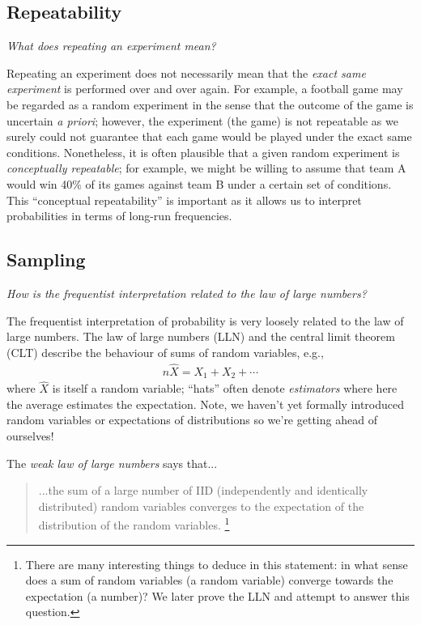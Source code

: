 \documentclass[11pt,a4paper]{article}
\begin{document}
\subsection{Repeatability}

\emph{What does repeating an experiment mean?}

Repeating an experiment does not necessarily mean 
that the \emph{exact same experiment} is performed over and over
again. 
For example, 
a football game may be regarded as a random experiment in 
the sense that the outcome of the game is uncertain \emph{a priori}; 
however, 
the experiment (the game) is not repeatable as
we surely could not guarantee that each game would be played
under the exact same conditions. 
Nonetheless, 
it is often plausible that a given random experiment 
is \emph{conceptually repeatable}; 
for example,
we might be willing to assume that team A would win 40\% of
its games against team B under a certain set of conditions. 
This ``conceptual repeatability'' is important as it allows us to interpret
probabilities in terms of long-run frequencies.

\subsection{Sampling}

\emph{How is the frequentist interpretation related to the law of large numbers?}

The frequentist interpretation of probability is very loosely related to the law of large numbers.
The law of large numbers (LLN)
and the central limit theorem (CLT) describe the behaviour of sums of random variables, e.g.,
\begin{align}
n\widehat{X} = X_{1} + X_{2} + \cdots
\end{align}
where \(\widehat{X}\) is itself a random variable; 
``hats'' often denote \emph{estimators} where here the average estimates the expectation. 
Note, we haven't yet formally introduced random variables or 
expectations of distributions so we're getting ahead of ourselves!

The \emph{weak law of large numbers} says that...

\begin{quote}
...the sum of a large number of IID
(independently and identically distributed) random variables
converges to the expectation of the distribution
of the random variables.%
\footnote{
There are many interesting things to deduce in this statement: 
in what sense does a sum of random variables (a random variable) converge
towards the expectation (a number)?
We later prove the LLN and attempt to answer this question. 
}
\end{quote}
\end{document}
